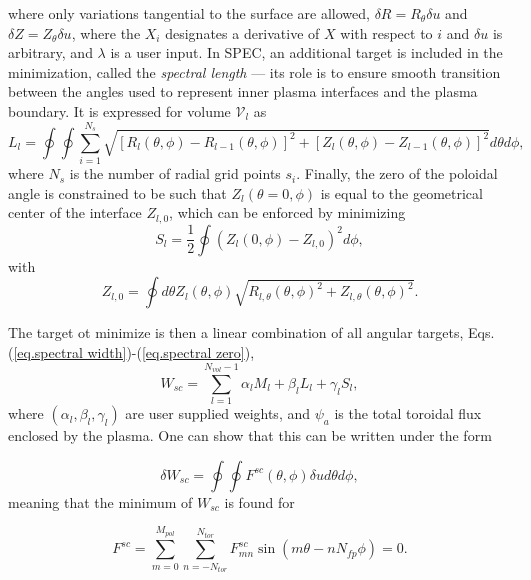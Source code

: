 where only variations tangential to the surface are allowed, $\delta R = R_\theta\delta u$ and $\delta Z = Z_\theta\delta u$, where the $X_i$ designates a derivative of $X$ with respect to $i$ and $\delta u$ is arbitrary, and $\lambda$ is a user input. In SPEC, an additional target is included in the minimization, called the \emph{spectral length} --- its role is to ensure smooth transition between the angles used to represent inner plasma interfaces and the plasma boundary. It is expressed for volume $\mathcal{V}_l$ as 
\begin{equation}
	L_l = \oint\oint\sum_{i=1}^{N_s}\sqrt{[R_l(\theta,\phi)-R_{l-1}(\theta,\phi)]^2 +  [Z_l(\theta,\phi)-Z_{l-1}(\theta,\phi)]^2}d\theta d\phi, \label{eq.spectral length}
\end{equation}
where $N_s$ is the number of radial grid points $s_i$. Finally, the zero of the poloidal angle is constrained to be such that ${Z}_l(\theta=0,\phi)$ is equal to the geometrical center of the interface $Z_{l,0}$, which can be enforced by minimizing
\begin{equation}
	S_l = \frac{1}{2}\oint ({Z}_l(0,\phi) - Z_{l,0})^2 d\phi, \label{eq.spectral zero}
\end{equation}
with
\begin{equation}
	Z_{l,0} = \oint d\theta Z_l(\theta,\phi)\sqrt{R_{l,\theta}(\theta,\phi)^2 + Z_{l,\theta}(\theta,\phi)^2}.
\end{equation}

The target ot minimize is then a linear combination of all angular targets, Eqs.(\ref{eq.spectral width})-(\ref{eq.spectral zero}),
\begin{equation}
	W_{sc} = \sum_{l=1}^{N_{vol}-1} \alpha_lM_l + \beta_lL_l + \gamma_l S_l,
\end{equation}
where $(\alpha_l,\beta_l,\gamma_l)$ are user supplied weights, and $\psi_a$ is the total toroidal flux enclosed by the plasma. One can show that this can be written under the form

\begin{equation}
	\delta W_{sc} = \oint\oint F^{sc}(\theta,\phi) \delta u d\theta d\phi,
\end{equation}
meaning that the minimum of $W_{sc}$ is found for 

\begin{equation}
	F^{sc} = \sum_{m=0}^{M_{pol}} \sum_{n=-N_{tor}}^{N_{tor}} F^{sc}_{mn} \sin(m\theta-nN_{fp}\phi) = 0. \label{eq. spectral constraint}
\end{equation}


